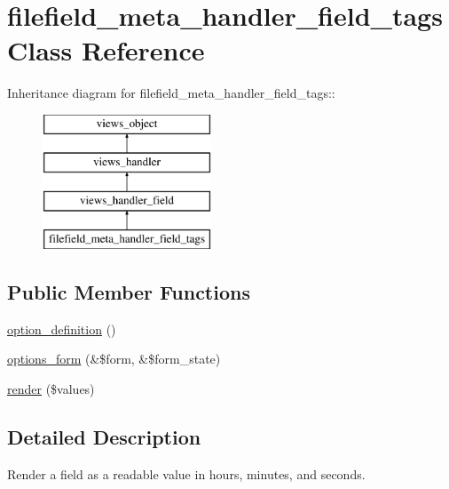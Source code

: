\hypertarget{classfilefield__meta__handler__field__tags}{
\section{filefield\_\-meta\_\-handler\_\-field\_\-tags Class Reference}
\label{classfilefield__meta__handler__field__tags}
}
Inheritance diagram for filefield\_\-meta\_\-handler\_\-field\_\-tags::\begin{figure}[H]
\begin{center}
\leavevmode
\includegraphics[height=4cm]{classfilefield__meta__handler__field__tags}
\end{center}
\end{figure}
\subsection*{Public Member Functions}
\begin{CompactItemize}
\item 
\hyperlink{classfilefield__meta__handler__field__tags_9e809bb733cce1fcd37a59a251c70014}{option\_\-definition} ()
\item 
\hyperlink{classfilefield__meta__handler__field__tags_b95bd58dd3d2486b63c2498410cc65be}{options\_\-form} (\&\$form, \&\$form\_\-state)
\item 
\hyperlink{classfilefield__meta__handler__field__tags_65aaea80f0139f1a83bd876273fdec51}{render} (\$values)
\end{CompactItemize}


\subsection{Detailed Description}
Render a field as a readable value in hours, minutes, and seconds. 

